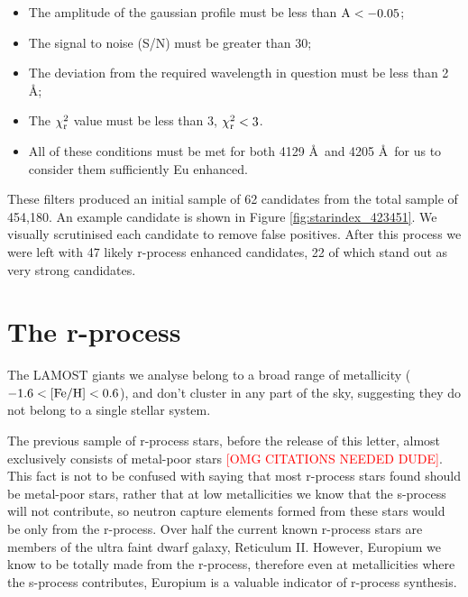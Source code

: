 \documentclass[a4paper,fleqn,usenatbib]{mnras}
\newcommand{\todo}[1]{\textcolor{red}{#1}}
\begin{document}
	\begin{itemize}
		\item The amplitude of the gaussian profile must be less than $\rm{A}<-0.05$;
		\item The signal to noise (S/N) must be greater than 30;
		\item The deviation from the required wavelength in question must be less than 2 \AA;
		\item The  $\chi_{\rm{r}}^{2}$ value must be less than 3, $\chi_{\rm{r}}^{2}<3$.
		\item All of these conditions must be met for both 4129 \AA\ and 4205 \AA\ for us to consider them sufficiently Eu enhanced.
	\end{itemize}   
	
	These filters produced an initial sample of 62 candidates from the total sample of 454,180. An example candidate is shown in Figure \ref{fig:starindex_423451}. We visually scrutinised each candidate to remove false positives. After this process we were left with 47 likely r-process enhanced candidates, 22 of which stand out as very strong candidates.
	
	\section{The r-process}
	
	The LAMOST giants we analyse belong to a broad range of metallicity ($-1.6 < \rm{[Fe/H]} < 0.6$), and don't cluster in any part of the sky, suggesting they do not belong to a single stellar system.
	
	The previous sample of r-process stars, before the release of this letter, almost exclusively consists of metal-poor stars \todo{[OMG CITATIONS NEEDED DUDE]}. This fact is not to be confused with saying that most r-process stars found should be metal-poor stars, rather that at low metallicities we know that the s-process will not contribute, so neutron capture elements formed from these stars would be only from the r-process. Over half the current known r-process stars are members of the ultra faint dwarf galaxy, Reticulum II. However, Europium we know to be totally made from the r-process, therefore even at metallicities where the s-process contributes, Europium is a valuable indicator of r-process synthesis.
	
\end{document}
